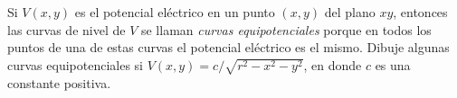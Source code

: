\item Si $V(x, y)$ es el potencial eléctrico en un punto $(x, y)$ del plano $xy$, entonces las curvas de nivel de $V$ se llaman \textit{curvas equipotenciales} porque en todos los puntos de una de estas curvas el potencial eléctrico es el mismo. Dibuje algunas curvas equipotenciales si $V(x, y) = c/\sqrt{r^2 - x^2 - y^2}$, en donde $c$ es una constante positiva.

